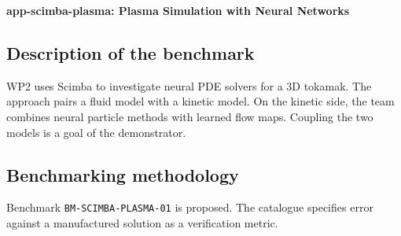 \textbf{app-scimba-plasma: Plasma Simulation with Neural Networks}
\label{sec:app:specs:app-scimba-plasma}



\subsection{Description of the benchmark}
WP2 uses Scimba to investigate neural PDE solvers for a 3D tokamak.
The approach pairs a fluid model with a kinetic model. On the kinetic
side, the team combines neural particle methods with learned flow
maps. Coupling the two models is a goal of the demonstrator.

\subsection{Benchmarking methodology}
Benchmark \texttt{BM-SCIMBA-PLASMA-01} is proposed. The catalogue
specifies error against a manufactured solution as a verification
metric.
